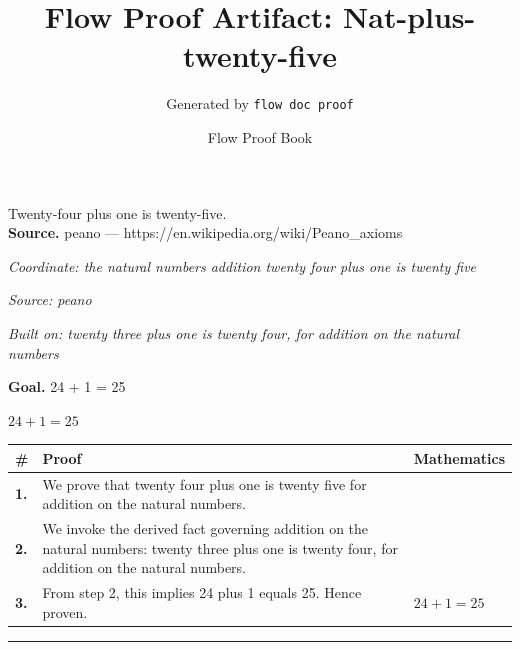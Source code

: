 \documentclass[11pt]{article}
\title{Flow Proof Artifact: Nat-plus-twenty-five}
\author{Generated by \texttt{flow doc proof}}
\date{Flow Proof Book}
\theoremstyle{definition}
\begin{document}
\maketitle
Twenty-four plus one is twenty-five.\\[0.5em]
\textbf{Source.} peano — https://en.wikipedia.org/wiki/Peano\_axioms\\[0.5em]
\bigskip
{}\par
\smallskip\noindent\textit{Coordinate: the natural numbers \cdot addition \cdot twenty four plus one is twenty five}\par
\smallskip\noindent\textit{Source: peano}\par
\smallskip\noindent\textit{Built on: twenty three plus one is twenty four, for addition on the natural numbers}\par
\medskip
\noindent\textbf{Goal.} 24 + 1 = 25\par
\noindent$\displaystyle 24 + 1 = 25$\par
\medskip
\noindent
\begin{tabular}{@{} >{\raggedright\arraybackslash}p{} >{\raggedright\arraybackslash}p{} >{\raggedleft\arraybackslash}p{} @{}}
\textbf{\#} & \textbf{Proof} & \textbf{Mathematics} \\
\midrule
\textbf{1.} & We prove that twenty four plus one is twenty five for addition on the natural numbers. & \\[0.45em]
\textbf{2.} & We invoke the derived fact governing addition on the natural numbers: twenty three plus one is twenty four, for addition on the natural numbers. & \\[0.45em]
\textbf{3.} & From step 2, this implies 24 plus 1 equals 25. Hence proven. & $\displaystyle 24 + 1 = 25$ \\[0.45em]
\bottomrule
\end{tabular}
\label{thm:Nat-addition-twenty_four_plus_one_is_twenty_five}
\par\medskip\hrule
\end{document}

